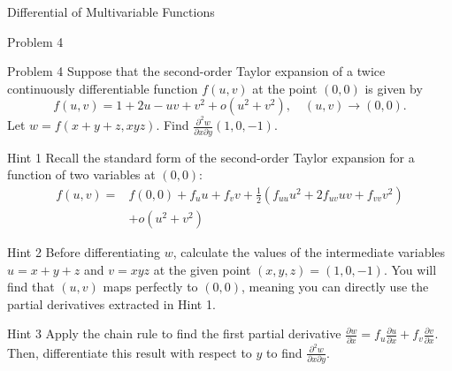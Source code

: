 \documentclass{beamer}
\begin{document}
\begin{section}{Differential of Multivariable Functions}
\begin{subsection}{Problem 4}
    \begin{frame}
        \begin{block}{Problem 4}
            Suppose that the second-order Taylor expansion of a twice continuously differentiable function $f(u,v)$ at the point $(0,0)$ is given by
            $$
            f(u,v) = 1 + 2u - uv + v^2 + o(u^2 + v^2), \quad (u,v) \to (0,0).
            $$
            Let $w = f(x+y+z, xyz)$. Find $\frac{\partial^2 w}{\partial x \partial y}(1,0,-1)$.
        \end{block}
    \end{frame}

    \begin{frame}
        \begin{block}{Hint 1}
            Recall the standard form of the second-order Taylor expansion for a function of two variables at $(0,0)$:
            \begin{align*}
            f(u,v) =&f(0,0) + f_u u + f_v v + \frac{1}{2}\left( f_{uu}u^2 + 2f_{uv}uv + f_{vv}v^2 \right)  \\ 
            &+ o(u^2+v^2)
            \end{align*}
               \end{block}

        \pause
        \vspace{1em}
        \begin{block}{Hint 2}
            Before differentiating $w$, calculate the values of the intermediate variables $u = x+y+z$ and $v = xyz$ at the given point $(x,y,z) = (1,0,-1)$. You will find that $(u,v)$ maps perfectly to $(0,0)$, meaning you can directly use the partial derivatives extracted in Hint 1.
        \end{block}
    \end{frame}

    \begin{frame}
        \begin{block}{Hint 3}
            Apply the chain rule to find the first partial derivative $\frac{\partial w}{\partial x} = f_u \frac{\partial u}{\partial x} + f_v \frac{\partial v}{\partial x}$. Then, differentiate this result with respect to $y$ to find $\frac{\partial^2 w}{\partial x \partial y}$. 
        \end{block}
    \end{frame}
\end{subsection}

\end{section}
\end{document}
